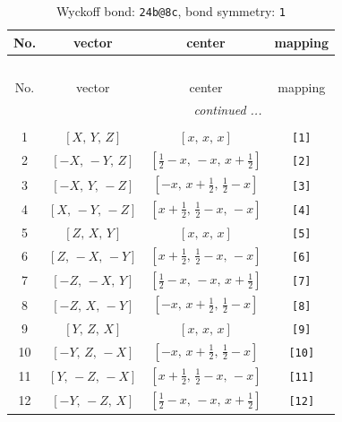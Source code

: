 \documentclass[fleqn,8pt]{jsarticle}
\begin{document}
\begin{longtable}{cccc}
\caption{Wyckoff bond: {\tt 24b@8c}, bond symmetry: {\tt 1}}
 \\
 \hline \hline
No. & vector & center & mapping \\ \hline \endfirsthead

\multicolumn{3}{l}{\tablename\ \thetable{}} \\
 \hline \hline
No. & vector & center & mapping \\ \hline \endhead

 \hline \hline
\multicolumn{3}{r}{\footnotesize\it continued ...} \\ \endfoot

 \hline \hline
\multicolumn{3}{r}{} \\ \endlastfoot

1 & $\left[ X,\, Y,\, Z \right]$ & $\left[ x,\, x,\, x \right]$ & {\tt [1]} \\ \hline
2 & $\left[ - X,\, - Y,\, Z \right]$ & $\left[ \frac{1}{2} - x,\, - x,\, x + \frac{1}{2} \right]$ & {\tt [2]} \\ \hline
3 & $\left[ - X,\, Y,\, - Z \right]$ & $\left[ - x,\, x + \frac{1}{2},\, \frac{1}{2} - x \right]$ & {\tt [3]} \\ \hline
4 & $\left[ X,\, - Y,\, - Z \right]$ & $\left[ x + \frac{1}{2},\, \frac{1}{2} - x,\, - x \right]$ & {\tt [4]} \\ \hline
5 & $\left[ Z,\, X,\, Y \right]$ & $\left[ x,\, x,\, x \right]$ & {\tt [5]} \\ \hline
6 & $\left[ Z,\, - X,\, - Y \right]$ & $\left[ x + \frac{1}{2},\, \frac{1}{2} - x,\, - x \right]$ & {\tt [6]} \\ \hline
7 & $\left[ - Z,\, - X,\, Y \right]$ & $\left[ \frac{1}{2} - x,\, - x,\, x + \frac{1}{2} \right]$ & {\tt [7]} \\ \hline
8 & $\left[ - Z,\, X,\, - Y \right]$ & $\left[ - x,\, x + \frac{1}{2},\, \frac{1}{2} - x \right]$ & {\tt [8]} \\ \hline
9 & $\left[ Y,\, Z,\, X \right]$ & $\left[ x,\, x,\, x \right]$ & {\tt [9]} \\ \hline
10 & $\left[ - Y,\, Z,\, - X \right]$ & $\left[ - x,\, x + \frac{1}{2},\, \frac{1}{2} - x \right]$ & {\tt [10]} \\ \hline
11 & $\left[ Y,\, - Z,\, - X \right]$ & $\left[ x + \frac{1}{2},\, \frac{1}{2} - x,\, - x \right]$ & {\tt [11]} \\ \hline
12 & $\left[ - Y,\, - Z,\, X \right]$ & $\left[ \frac{1}{2} - x,\, - x,\, x + \frac{1}{2} \right]$ & {\tt [12]} \\ \hline

\end{longtable}
\end{document}
